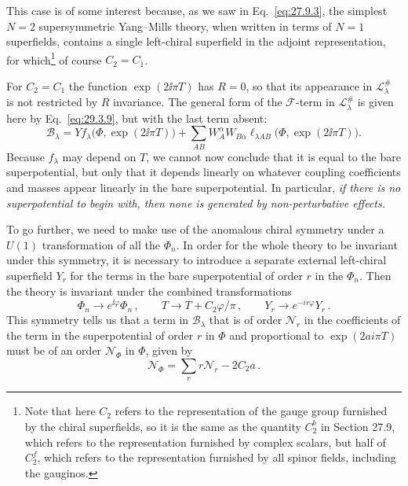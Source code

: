 This case is of some interest because, as we saw in
Eq.~\eqref{eq:27.9.3}, the simplest \(N=2\) supersymmetric Yang--Mills
theory, when written in terms of \(N=1\) superfields, contains a single
left-chiral superfield in the adjoint representation, for
which\footnote{Note that here \(C_2\) refers to the representation of the
gauge group furnished by the chiral superfields, so it is the same as the
quantity \(C_2^b\) in Section 27.9, which refers to the representation
furnished by complex scalars, but half of \(C_2^f\), which refers to the
representation furnished by all spinor fields, including the gauginos.}
of course \(C_2=C_1\).

For \(C_2=C_1\) the function \(\exp(2\ii\pi T)\) has \(R=0\), so that its
appearance in \(\mathcal{L}^{\#}_\lambda\) is not restricted by \(R\)
invariance. The general form of the \(\mathcal{F}\)-term in
\(\mathcal{L}^{\#}_\lambda\) is given here by Eq.~\eqref{eq:29.3.9}, but
with the last term absent:
\begin{equation}
  \mathcal{B}_\lambda
  =
  Yf_\lambda\bigl(\Phi,\exp(2\ii\pi T)\bigr)
  +\sum_{AB}W_A^\alpha W_{B\alpha}
  \ell_{\lambda AB}\bigl(\Phi,\exp(2\ii\pi T)\bigr).
  \tag{29.3.32}\label{eq:29.3.32}
\end{equation}
Because \(f_\lambda\) may depend on \(T\), we cannot now conclude that it
is equal to the bare superpotential, but only that it depends linearly on
whatever coupling coefficients and masses appear linearly in the bare
superpotential. In particular, \emph{if there is no superpotential to
begin with, then none is generated by non-perturbative effects.}

To go further, we need to make use of the anomalous chiral symmetry under a
\(U(1)\) transformation of all the \(\Phi_n\). In order for the whole
theory to be invariant under this symmetry, it is necessary to introduce a
separate external left-chiral superfield \(Y_r\) for the terms in the bare
superpotential of order \(r\) in the \(\Phi_n\). Then the theory is
invariant under the combined transformations
\begin{equation}
  \Phi_n\longrightarrow e^{\ii\varphi}\Phi_n\,,
  \qquad
  T\longrightarrow T+C_2\varphi/\pi\,,
  \qquad
  Y_r\longrightarrow e^{-ir\varphi}Y_r\,.
  \tag{29.3.33}\label{eq:29.3.33}
\end{equation}
This symmetry tells us that a term in \(\mathcal{B}_\lambda\) that is of
order \(\mathcal{N}_r\) in the coefficients of the term in the
superpotential of order \(r\) in \(\Phi\) and proportional to
\(\exp(2ai\pi T)\) must be of an order \(\mathcal{N}_\Phi\) in \(\Phi\),
given by
\begin{equation}
  \mathcal{N}_\Phi
  =
  \sum_r r\mathcal{N}_r-2C_2a\,.
  \tag{29.3.34}\label{eq:29.3.34}
\end{equation}

